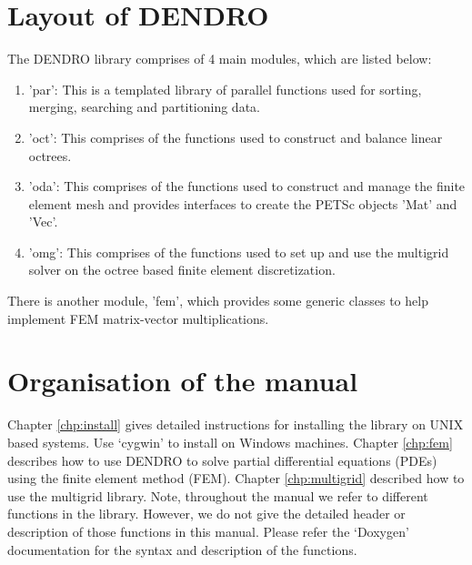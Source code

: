 \documentclass[12pt,reqno,a4paper]{report}
\numberwithin{equation}{section}
\begin{document}
\section{Layout of DENDRO}
\label{sec:layout}
The DENDRO library comprises of 4 main modules, which are listed below:
\begin{enumerate}
\item 'par': This is a templated library of parallel functions used for sorting, merging, searching and partitioning data.
\item 'oct': This comprises of the functions used to construct and balance linear octrees.
\item 'oda': This comprises of the functions used to construct and manage the finite element mesh and provides interfaces to create the PETSc objects 'Mat' and 'Vec'. 
\item 'omg': This comprises of the functions used to set up and use the multigrid solver on the octree based finite element discretization.
\end{enumerate}
There is another module, 'fem', which provides some generic classes to help implement FEM matrix-vector multiplications.

\section{Organisation of the manual}
\label{sec:organisation}
Chapter \ref{chp:install} gives detailed instructions for installing the library on UNIX based systems. Use `cygwin' to install on Windows machines. Chapter \ref{chp:fem} describes how to use DENDRO to solve partial differential equations (PDEs) using the finite element method (FEM). Chapter \ref{chp:multigrid} described how to use the multigrid library. Note, throughout the manual we refer to different functions in the library. However, we do not give the detailed header or description of those functions in this manual. Please refer the `Doxygen' documentation for the syntax and description of the functions.
\end{document}
